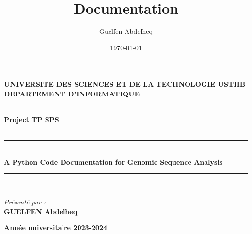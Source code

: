 \documentclass[11pt]{article}
\author{Guelfen Abdelheq}
\date{\today}
\title{Documentation}
\begin{document}
\begin{titlepage}

\begin{center}
\begin{minipage}{10cm}
	\begin{center}
	\textbf{UNIVERSITE DES SCIENCES ET DE LA TECHNOLOGIE USTHB}\\[0.1cm]
    \textbf{DEPARTEMENT D'INFORMATIQUE}
	\end{center}
\end{minipage}\hfill


\textsc{\Large }\\[2.5cm]
{\large \bfseries Project TP SPS}\\[1cm]

\textsc{\Large }\\[1cm]
\rule{\linewidth}{0.3mm} \\[0.4cm]
{ \huge \bfseries\color{darkblue} A Python Code Documentation for Genomic Sequence Analysis\\[0.4cm] }
\rule{\linewidth}{0.3mm} \\[3cm]


\noindent
\begin{minipage}{0.4\textwidth}
  \begin{flushleft} \large
    \emph{Présenté par :}\\
    \textbf{GUELFEN Abdelheq}\\
  \end{flushleft}
\end{minipage}

\vfill
{\textbf{\large {Année universitaire} 2023-2024}}
\end{center}
\end{titlepage}

\tableofcontents
\newpage
\end{document}

